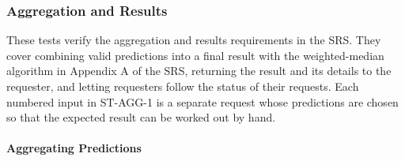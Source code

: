 \documentclass[12pt]{article}
\begin{document}
\subsubsection{Aggregation and Results}

These tests verify the aggregation and results requirements in the SRS. They
cover combining valid predictions into a final result with the weighted-median
algorithm in Appendix A of the SRS, returning the result and its details to the
requester, and letting requesters follow the status of their requests. Each
numbered input in ST-AGG-1 is a separate request whose predictions are chosen
so that the expected result can be worked out by hand.

\paragraph{Aggregating Predictions}
\end{document}

